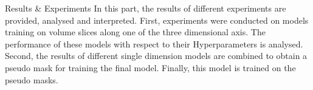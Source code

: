 \begin{partwithabstract}{Results \& Experiments}
    In this part, the results of different experiments are provided, analysed and interpreted.
    First, experiments were conducted on models training on volume slices along one of the three dimensional axis.
    The performance of these models with respect to their Hyperparameters is analysed.
    Second, the results of different single dimension models are combined to obtain a pseudo mask for training the final model.
    Finally, this model is trained on the pseudo masks.
\end{partwithabstract}
\restoregeometry



